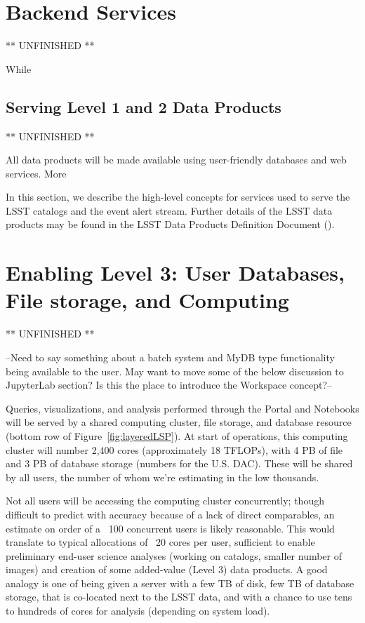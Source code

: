 \documentclass[DM,lsstdraft,toc]{lsstdoc}
\begin{document}
\section{Backend Services}

** UNFINISHED **

While 

\subsection{Serving Level 1 and 2 Data Products}

** UNFINISHED **

All data products will be made available using user-friendly databases and web services. More

In this section, we describe the high-level concepts for services used to serve the LSST catalogs and the event alert stream. Further details of the LSST data products may be found in the LSST Data Products Definition Document (\DPDD).

\section{Enabling Level 3: User Databases, File storage, and Computing}

** UNFINISHED **

--Need to say something about a batch system and MyDB type functionality being 
available to the user. May want to move some of the below discussion to
JupyterLab section? Is this the place to introduce the Workspace concept?--

Queries, visualizations, and analysis performed through the Portal and
Notebooks will be served by a shared computing cluster, file storage, and
database resource (bottom row of Figure~\ref{fig:layeredLSP}).  At start of operations,
this computing cluster will number 2,400 cores (approximately 18 TFLOPs),
with 4 PB of file and 3 PB of database storage (numbers for the U.S.  DAC). 
These will be shared by all users, the number of whom we’re estimating in
the low thousands.

Not all users will be accessing the computing cluster concurrently; though
difficult to predict with accuracy because of a lack of direct comparables,
an estimate on order of a ~100 concurrent users is likely reasonable.  This
would translate to typical allocations of ~20 cores per user, sufficient to
enable preliminary end-user science analyses (working on catalogs, smaller
number of images) and creation of some added-value (Level 3) data products. 
A good analogy is one of being given a server with a few TB of disk, few TB
of database storage, that is co-located next to the LSST data, and with a
chance to use tens to hundreds of cores for analysis (depending on system
load).
\end{document}
